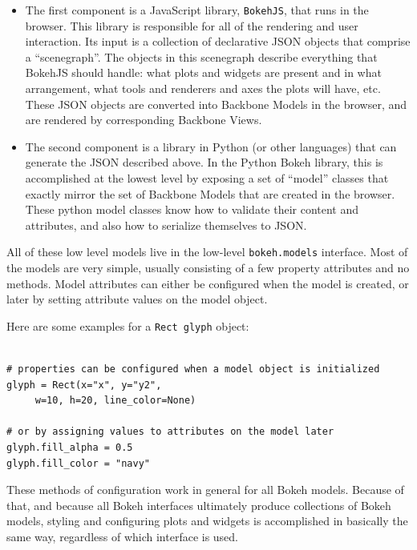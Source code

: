 \documentclass[a4paper,12pt]{article}
\begin{document}
\begin{itemize}
\item The first component is a JavaScript library, \texttt{BokehJS}, that runs in the browser. This library is responsible for all of the rendering and user interaction. Its input is a collection of declarative JSON objects that comprise a “scenegraph”. The objects in this scenegraph describe everything that BokehJS should handle: what plots and widgets are present and in what arrangement, what tools and renderers and axes the plots will have, etc. These JSON objects are converted into Backbone Models in the browser, and are rendered by corresponding Backbone Views.

\item The second component is a library in Python (or other languages) that can generate the JSON described above. In the Python Bokeh library, this is accomplished at the lowest level by exposing a set of “model” classes that exactly mirror the set of Backbone Models that are created in the browser. These python model classes know how to validate their content and attributes, and also how to serialize themselves to JSON. 

\end{itemize}


All of these low level models live in the low-level \texttt{bokeh.models} interface. Most of the models are very simple, usually consisting of a few property attributes and no methods. Model attributes can either be configured when the model is created, or later by setting attribute values on the model object. 

Here are some examples for a \texttt{Rect glyph} object:

\begin{framed}
\begin{verbatim}

# properties can be configured when a model object is initialized
glyph = Rect(x="x", y="y2", 
     w=10, h=20, line_color=None)

# or by assigning values to attributes on the model later
glyph.fill_alpha = 0.5
glyph.fill_color = "navy"
\end{verbatim}
\end{framed}
These methods of configuration work in general for all Bokeh models. Because of that, and because all Bokeh interfaces ultimately produce collections of Bokeh models, styling and configuring plots and widgets is accomplished in basically the same way, regardless of which interface is used.
\end{document}

